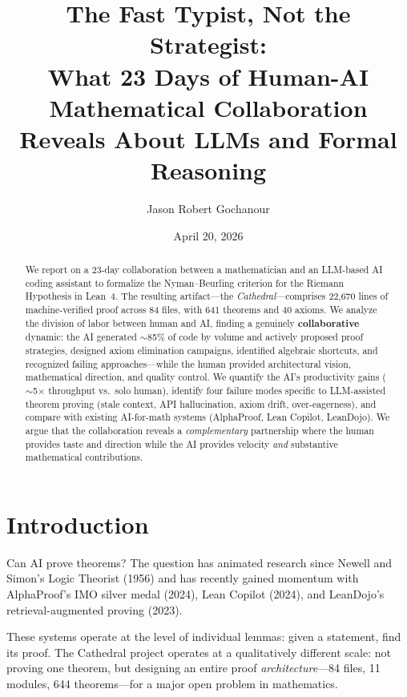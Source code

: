 \documentclass[11pt,a4paper]{article}
\title{%
  The Fast Typist, Not the Strategist:\\
  What 23 Days of Human-AI Mathematical Collaboration\\
  Reveals About LLMs and Formal Reasoning%
}
\author{
  Jason Robert Gochanour
}
\date{April 20, 2026}
\begin{document}
\maketitle

\begin{abstract}
We report on a 23-day collaboration between a mathematician and an
LLM-based AI coding assistant to formalize the Nyman--Beurling
criterion for the Riemann Hypothesis in Lean~4. The resulting
artifact---the \emph{Cathedral}---comprises 22,670 lines of
machine-verified proof across 84 files, with 641 theorems and 40
axioms. We analyze the division of labor between human and AI,
finding a genuinely \textbf{collaborative} dynamic: the AI
generated $\sim$85\% of code by volume and actively proposed
proof strategies, designed axiom elimination campaigns, identified
algebraic shortcuts, and recognized failing approaches---while the
human provided architectural vision, mathematical direction, and
quality control. We quantify the AI's productivity gains
($\sim$5$\times$ throughput vs.\ solo human), identify four failure
modes specific to LLM-assisted theorem proving (stale context, API
hallucination, axiom drift, over-eagerness), and compare with
existing AI-for-math systems (AlphaProof, Lean Copilot, LeanDojo).
We argue that the collaboration reveals a \emph{complementary}
partnership where the human provides taste and direction while the
AI provides velocity \emph{and} substantive mathematical
contributions.
\end{abstract}

\tableofcontents

\section{Introduction}

Can AI prove theorems? The question has animated research since
Newell and Simon's Logic Theorist (1956) and has recently gained
momentum with AlphaProof's IMO silver medal (2024), Lean Copilot
(2024), and LeanDojo's retrieval-augmented proving (2023).

These systems operate at the level of individual lemmas: given a
statement, find its proof. The Cathedral project operates at a
qualitatively different scale: not proving one theorem, but designing
an entire proof \emph{architecture}---84 files, 11 modules, 644
theorems---for a major open problem in mathematics.
\end{document}
